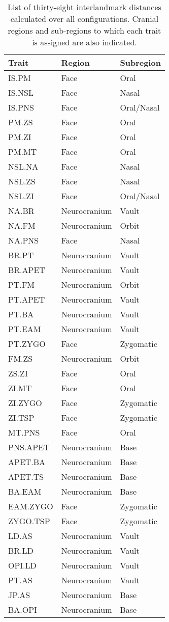 \begin {table}[hp]
  \centering
  \caption {List of thirty-eight interlandmark distances calculated over all configurations. Cranial regions and sub-regions to which each trait is assigned are also indicated.}
  \label {tab:dist_en}
  \hr
  \begin {tabularx} {\textwidth} {X X X}
    \bf{Trait} & \bf{Region} & \bf{Subregion}  \\
    \hline
    IS.PM & Face & Oral \\
    IS.NSL & Face & Nasal \\
    IS.PNS & Face & Oral/Nasal \\
    PM.ZS & Face & Oral \\
    PM.ZI & Face & Oral \\
    PM.MT & Face & Oral \\
    NSL.NA & Face & Nasal \\
    NSL.ZS & Face & Nasal \\
    NSL.ZI & Face & Oral/Nasal \\
    NA.BR & Neurocranium & Vault \\
    NA.FM & Neurocranium & Orbit \\
    NA.PNS & Face & Nasal \\
    BR.PT & Neurocranium & Vault \\
    BR.APET & Neurocranium & Vault \\
    PT.FM & Neurocranium & Orbit \\
    PT.APET & Neurocranium & Vault \\
    PT.BA & Neurocranium & Vault \\
    PT.EAM & Neurocranium & Vault \\
    PT.ZYGO & Face & Zygomatic \\
    FM.ZS & Neurocranium & Orbit \\
    ZS.ZI & Face & Oral \\
    ZI.MT & Face & Oral \\
    ZI.ZYGO & Face & Zygomatic \\
    ZI.TSP & Face & Zygomatic \\
    MT.PNS & Face & Oral \\
    PNS.APET & Neurocranium & Base \\
    APET.BA & Neurocranium & Base \\
    APET.TS & Neurocranium & Base \\
    BA.EAM & Neurocranium & Base \\
    EAM.ZYGO & Face & Zygomatic \\
    ZYGO.TSP & Face & Zygomatic \\
    LD.AS & Neurocranium & Vault \\
    BR.LD & Neurocranium & Vault \\
    OPI.LD & Neurocranium & Vault \\
    PT.AS & Neurocranium & Vault \\
    JP.AS & Neurocranium & Base \\
    BA.OPI & Neurocranium & Base \\
  \end {tabularx}
  \hr
\end {table} %